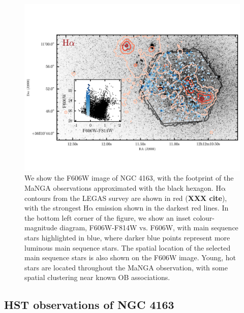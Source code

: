 \documentclass[preprint2]{aastex62}
\newcommand\vs{\ensuremath{\mathrm{vs.}}\xspace}
\newcommand{\ha}{\ensuremath{\mathrm{H\alpha}}\xspace}
\begin{document}
\begin{figure}
  \begin{center}
    \includegraphics[width=\linewidth]{figs/f1.png}
    \caption{We show the F606W image of NGC 4163, with the footprint of the MaNGA observations approximated with the black hexagon. \ha contours from the LEGAS survey are shown in red (\textbf{XXX cite}), with the strongest \ha emission shown in the darkest red lines. In the bottom left corner of the figure, we show an inset colour-magnitude diagram, F606W-F814W \vs F606W, with main sequence stars highlighted in blue, where darker blue points represent more luminous main sequence stars. The spatial location of the selected main sequence stars is also shown on the F606W image. Young, hot stars are located throughout the MaNGA observation, with some spatial clustering near known OB associations.}
    \label{fig:FOV}
  \end{center}
\end{figure}

\subsection{HST observations of NGC 4163}\label{sec:data:hst}
\end{document}
